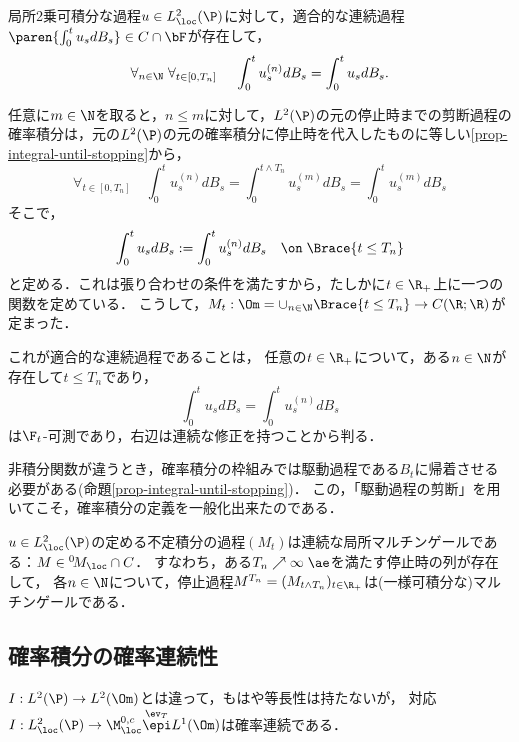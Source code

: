 \documentclass[uplatex,dvipdfmx]{jsreport}
\begin{document}
\begin{proposition}\label{prop-stochastic-integral-for-locally-integrable-processes}
    局所2乗可積分な過程$u\in L^2_\loc(\P)$に対して，適合的な連続過程$\paren{\int^t_0u_sdB_s}\in C\cap\bF$が存在して，
    \[\forall_{n\in\N}\;\forall_{t\in[0,T_n]}\;\quad\int^t_0u_s^{(n)}dB_s=\int^t_0u_sdB_s.\]
\end{proposition}
\begin{Proof}
    任意に$m\in\N$を取ると，$n\le m$に対して，$L^2(\P)$の元の停止時までの剪断過程の確率積分は，元の$L^2(\P)$の元の確率積分に停止時を代入したものに等しい\ref{prop-integral-until-stopping}から，
    \[\forall_{t\in[0,T_n]}\quad\int^t_0u_s^{(n)}dB_s=\int^{t\land T_n}_0u^{(m)}_sdB_s=\int^t_0u_s^{(m)}dB_s\]
    そこで，
    \[\int^t_0u_sdB_s:=\int^t_0u_s^{(n)}dB_s\quad\on\;\Brace{t\le T_n}\]
    と定める．これは張り合わせの条件を満たすから，たしかに$t\in\R_+$上に一つの関数を定めている．
    こうして，$M_t:\Om=\cup_{n\in\N}\Brace{t\le T_n}\to C(\R;\R)$が定まった．

    これが適合的な連続過程であることは，
    任意の$t\in\R_+$について，ある$n\in\N$が存在して$t\le T_n$であり，
    \[\int^t_0u_sdB_s=\int^t_0u_s^{(n)}dB_s\]
    は$\F_t$-可測であり，右辺は連続な修正を持つことから判る．
\end{Proof}
\begin{remarks}[駆動過程の剪断]
    非積分関数が違うとき，確率積分の枠組みでは駆動過程である$B_t$に帰着させる必要がある(命題\ref{prop-integral-until-stopping})．
    この，「駆動過程の剪断」を用いてこそ，確率積分の定義を一般化出来たのである．
\end{remarks}

\begin{corollary}[一般化された確率積分の局所マルチンゲール性]
    $u\in L^2_\loc(\P)$の定める不定積分の過程$(M_t)$は連続な局所マルチンゲールである：$M\in{}^0\!M_\loc\cap C$．
    すなわち，ある$T_n\nearrow\infty\;\ae$を満たす停止時の列が存在して，
    各$n\in\N$について，停止過程$M^{T_n}=(M_{t\land T_n})_{t\in\R_+}$は(一様可積分な)マルチンゲールである．
\end{corollary}

\subsection{確率積分の確率連続性}

\begin{tcolorbox}[colframe=ForestGreen, colback=ForestGreen!10!white,breakable,colbacktitle=ForestGreen!40!white,coltitle=black,fonttitle=\bfseries\sffamily,
title=]
    $I:L^2(\P)\to L^2(\Om)$とは違って，もはや等長性は持たないが，
    対応$I:L^2_\loc(\P)\to\M^{0,c}_\loc\overset{\ev_T}{\epi} L^1(\Om)$は確率連続である．
\end{tcolorbox}
\end{document}
